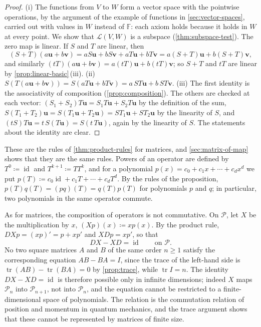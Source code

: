 \begin{proof}
(i) The functions from $V$ to $W$ form a vector space with the pointwise operations, by the argument of the example of functions in \cref{sec:vector-spaces}, carried out with values in $W$ instead of $\mathbb F$: each axiom holds because it holds in $W$ at every point. We show that $\mathcal L(V,W)$ is a subspace (\cref{thm:subspace-test}). The zero map is linear. If $S$ and $T$ are linear, then
\[
(S+T)(a\mathbf u+b\mathbf v)=aS\mathbf u+bS\mathbf v+aT\mathbf u+bT\mathbf v=a(S+T)\mathbf u+b(S+T)\mathbf v,
\]
and similarly $(tT)(a\mathbf u+b\mathbf v)=a(tT)\mathbf u+b(tT)\mathbf v$; so $S+T$ and $tT$ are linear by \cref{prop:linear-basic}\,(iii). (ii) $S(T(a\mathbf u+b\mathbf v))=S(aT\mathbf u+bT\mathbf v)=a\,ST\mathbf u+b\,ST\mathbf v$. (iii) The first identity is the associativity of composition (\cref{prop:composition}). The others are checked at each vector: $(S_1+S_2)T\mathbf u=S_1T\mathbf u+S_2T\mathbf u$ by the definition of the sum, $S(T_1+T_2)\mathbf u=S(T_1\mathbf u+T_2\mathbf u)=ST_1\mathbf u+ST_2\mathbf u$ by the linearity of $S$, and $(tS)T\mathbf u=t\,S(T\mathbf u)=S(t\,T\mathbf u)$, again by the linearity of $S$. The statements about the identity are clear.
\end{proof}

These are the rules of \cref{thm:product-rules} for matrices, and \cref{sec:matrix-of-map} shows that they are the same rules. Powers of an operator are defined by $T^0\coloneqq\operatorname{id}$ and $T^{k+1}\coloneqq TT^k$, and for a polynomial $p(x)=c_0+c_1x+\cdots+c_dx^d$ we put $p(T)\coloneqq c_0\operatorname{id}+c_1T+\cdots+c_dT^d$. By the rules of the proposition, $p(T)q(T)=(pq)(T)=q(T)p(T)$ for polynomials $p$ and $q$; in particular, two polynomials in the same operator commute.

As for matrices, the composition of operators is not commutative. On $\mathcal P$, let $X$ be the multiplication by $x$, $(Xp)(x)\coloneqq xp(x)$. By the product rule, $DXp=(xp)'=p+xp'$ and $XDp=xp'$, so that
\[
DX-XD=\operatorname{id}\qquad\text{on }\mathcal P .
\]
No two square matrices $A$ and $B$ of the same order $n\ge1$ satisfy the corresponding equation $AB-BA=I$, since the trace of the left-hand side is $\operatorname{tr}(AB)-\operatorname{tr}(BA)=0$ by \cref{prop:trace}, while $\operatorname{tr}I=n$. The identity $DX-XD=\operatorname{id}$ is therefore possible only in infinite dimensions; indeed $X$ maps $\mathcal P_n$ into $\mathcal P_{n+1}$, not into $\mathcal P_n$, and the equation cannot be restricted to a finite-dimensional space of polynomials. The relation is the commutation relation of position and momentum in quantum mechanics, and the trace argument shows that these cannot be represented by matrices of finite size.


